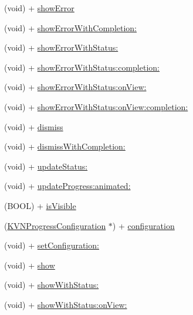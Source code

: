 \begin{DoxyCompactItemize}
\item 
(void) + \mbox{\hyperlink{interface_k_v_n_progress_aca67ff95ae9a6d0ad5237fdc1d5dd34c}{show\+Error}}
\item 
(void) + \mbox{\hyperlink{interface_k_v_n_progress_a9de6833483cb5bd061d150e8fb42e5f8}{show\+Error\+With\+Completion\+:}}
\item 
(void) + \mbox{\hyperlink{interface_k_v_n_progress_a3125f228cdd6685e4cf74fa960bfa234}{show\+Error\+With\+Status\+:}}
\item 
(void) + \mbox{\hyperlink{interface_k_v_n_progress_a518bc804665bbc2a01905a6b4caf9459}{show\+Error\+With\+Status\+:completion\+:}}
\item 
(void) + \mbox{\hyperlink{interface_k_v_n_progress_a639e363838fbea785adea0aa9b39ca39}{show\+Error\+With\+Status\+:on\+View\+:}}
\item 
(void) + \mbox{\hyperlink{interface_k_v_n_progress_a6cc598f816de8d78d34ab7a9d2216512}{show\+Error\+With\+Status\+:on\+View\+:completion\+:}}
\item 
(void) + \mbox{\hyperlink{interface_k_v_n_progress_a4b11cd2b647d08b5c05cf79b99e3f588}{dismiss}}
\item 
(void) + \mbox{\hyperlink{interface_k_v_n_progress_a7ec9c844ebb26d0f9cdff6ef3d737d28}{dismiss\+With\+Completion\+:}}
\item 
(void) + \mbox{\hyperlink{interface_k_v_n_progress_ab50b37330761d25ce8b261290537da1a}{update\+Status\+:}}
\item 
(void) + \mbox{\hyperlink{interface_k_v_n_progress_a70c537364b9ea751af24178448335b98}{update\+Progress\+:animated\+:}}
\item 
(B\+O\+OL) + \mbox{\hyperlink{interface_k_v_n_progress_a28dddb521ec06e907b8cc436b34e71cb}{is\+Visible}}
\item 
(\mbox{\hyperlink{interface_k_v_n_progress_configuration}{K\+V\+N\+Progress\+Configuration}} $\ast$) + \mbox{\hyperlink{interface_k_v_n_progress_aaba9484a867f6da9cb051da337161d15}{configuration}}
\item 
(void) + \mbox{\hyperlink{interface_k_v_n_progress_ab00ed30bcc9ef7e6517f27554d570bf9}{set\+Configuration\+:}}
\item 
(void) + \mbox{\hyperlink{interface_k_v_n_progress_ad27933d0b2a65108404a514029689fb8}{show}}
\item 
(void) + \mbox{\hyperlink{interface_k_v_n_progress_af86acbff98a05f0ee39e746628b02022}{show\+With\+Status\+:}}
\item 
(void) + \mbox{\hyperlink{interface_k_v_n_progress_ae317161c16121fa1b3dcdb9c1e9f7a8f}{show\+With\+Status\+:on\+View\+:}}

\end{DoxyCompactItemize}
